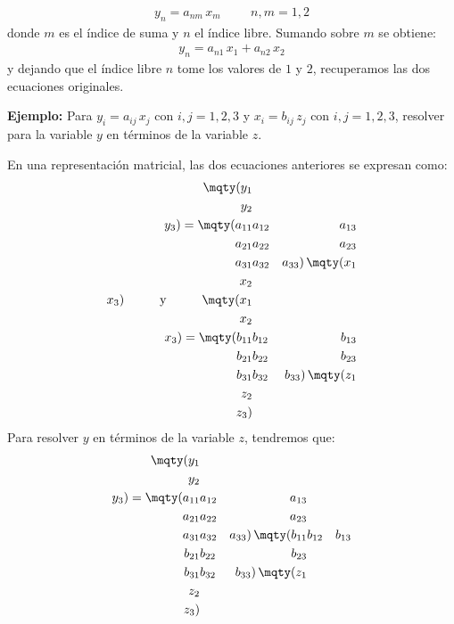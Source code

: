 \begin{align*}
y_{n} = a_{nm} \, x_{m} \hspace{1cm} n, m = 1, 2
\end{align*}
donde $m$ es el índice de suma y $n$ el índice libre. Sumando sobre $m$ se obtiene:
\begin{align*}
y_{n} = a_{n1} \, x_{1} + a_{n2} \, x_{2}
\end{align*}
y dejando que el índice libre $n$ tome los valores de $1$ y $2$, recuperamos las dos ecuaciones originales.
\par
\noindent
\textbf{Ejemplo: } Para $y_{i} = a_{ij} \, x_{j}$ con $i, j = 1, 2, 3$ y $x_{i} = b_{ij} \, z_{j}$ con $i, j = 1, 2, 3$, resolver para la variable $y$ en términos de la variable $z$.
\par
En una representación matricial, las dos ecuaciones anteriores se expresan como:
\begin{align*}
\mqty(y_{1} \\ y_{2} \\ y_{3}) = \mqty(
a_{11} & a_{12} & a_{13} \\
a_{21} & a_{22} & a_{23} \\
a_{31} & a_{32} & a_{33})
\, \mqty(
x_{1} \\ x_{2} \\ x_{3}
) \hspace{1cm} \mbox{y} \hspace{1cm}
\mqty(x_{1} \\ x_{2} \\ x_{3}) = \mqty(
b_{11} & b_{12} & b_{13} \\
b_{21} & b_{22} & b_{23} \\
b_{31} & b_{32} & b_{33})
\, \mqty(z_{1} \\ z_{2} \\ z_{3})
\end{align*}
Para resolver $y$ en términos de la variable $z$, tendremos que:
\begin{align*}
\mqty(y_{1} \\ y_{2} \\ y_{3}) = \mqty(
a_{11} & a_{12} & a_{13} \\
a_{21} & a_{22} & a_{23} \\
a_{31} & a_{32} & a_{33})
\, \mqty(
b_{11} & b_{12} & b_{13} \\
b_{21} & b_{22} & b_{23} \\
b_{31} & b_{32} & b_{33})
\, \mqty(z_{1} \\ z_{2} \\ z_{3})
\end{align*}
